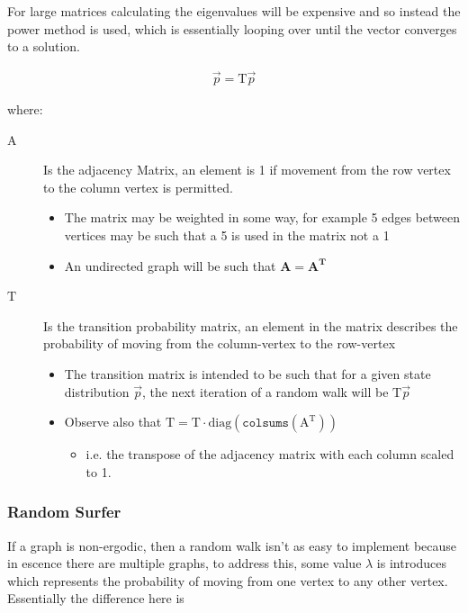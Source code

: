 \documentclass[11pt]{article}
\begin{document}
For large matrices calculating the eigenvalues will be expensive and so instead the power method is used, which is essentially looping over until the vector converges to a solution.

\begin{align}
\vec{p} = \mathrm{T}\vec{p} \label{eq:pageRank-Method}
\end{align}

where:

\begin{description}
\item[{\(\mathrm{A}\)}] Is the adjacency Matrix, an element is 1 if movement from the row vertex to the column vertex is permitted.
\begin{itemize}
\item The matrix may be weighted in some way, for example 5 edges between vertices may be such that a 5 is used in the matrix not a 1
\item An undirected graph will be such that \(\mathbf{A} = \mathbf{A}^{\mathrm{\mathbf{T}}}\)
\end{itemize}
\item[{\(\mathrm{T}\)}] Is the transition probability matrix, an element in the matrix describes the probability of moving from the column-vertex to the row-vertex
\begin{itemize}
\item The transition matrix is intended to be such that for a given state distribution \(\vec{p}\), the next iteration of a random walk will be \(\mathrm{T}\vec{p}\)
\item Observe also that \(\mathrm{T} = \mathrm{T} \cdot \mathrm{diag}(\mathtt{colsums}(\mathrm{A^{\mathrm{T}}}))\)
\begin{itemize}
\item i.e. the transpose of the adjacency matrix with each column scaled to 1.
\end{itemize}
\end{itemize}
\end{description}

\subsubsection{Random Surfer}
\label{sec:org31b2601}

If a graph is non-ergodic, then a random walk isn't as easy to implement because in escence there are multiple graphs, to address this, some value \(\lambda\) is introduces which represents the probability of moving from one vertex to any other vertex.
Essentially the difference here is
\end{document}
